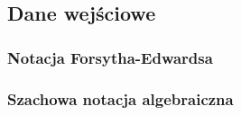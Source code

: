 \subsection{Dane wejściowe}
\label{subsec:dane-wejsciowe}

\subsubsection{Notacja Forsytha-Edwardsa}

\subsubsection{Szachowa notacja algebraiczna}